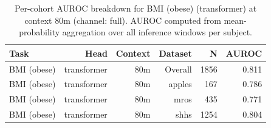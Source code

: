 \begin{table}[ht]
\centering
\caption{Per-cohort AUROC breakdown for BMI (obese) (transformer) at context 80m (channel: full). AUROC computed from mean-probability aggregation over all inference windows per subject.}
\label{tab:cohort_bmi_binary_transformer_full}
\begin{tabular}{lrrrrr}
\toprule
Task & Head & Context & Dataset & N & AUROC \\
\midrule
BMI (obese) & transformer & 80m & Overall & 1856 & 0.811 \\
BMI (obese) & transformer & 80m & apples & 167 & 0.786 \\
BMI (obese) & transformer & 80m & mros & 435 & 0.771 \\
BMI (obese) & transformer & 80m & shhs & 1254 & 0.804 \\
\bottomrule
\end{tabular}
\end{table}